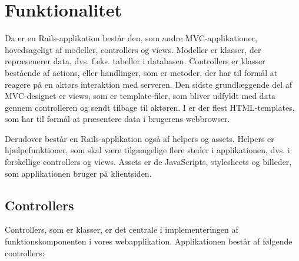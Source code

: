 \section{Funktionalitet}
\label{sec:funktionalitet}

Da {\Foodl} er en Rails-applikation består den, som andre MVC-applikationer, hovedsageligt af modeller, controllers og views. Modeller er klasser, der repræsenerer data, dvs. f.eks. tabeller i databasen. Controllers er klasser bestående af actions, eller handlinger, som er metoder, der har til formål at reagere på en aktørs interaktion med serveren. Den sidste grundlæggende del af MVC-designet er views, som er template-filer, som bliver udfyldt med data gennem controlleren og sendt tilbage til aktøren. I \Foodl{} er der flest HTML-templates, som har til formål at præsentere data i brugerens webbrowser.

Derudover består en Rails-applikation også af helpers og assets. Helpers er hjælpefunktioner, som skal være tilgængelige flere steder i applikationen, dvs. i forskellige controllers og views. Assets er de JavaScripts, stylesheets og billeder, som applikationen bruger på klientsiden. 

\subsection{Controllers}
\label{sec:controllers}

Controllers, som er klasser, er det centrale i implementeringen af funktionskomponenten i vores webapplikation. Applikationen består af følgende controllers:

